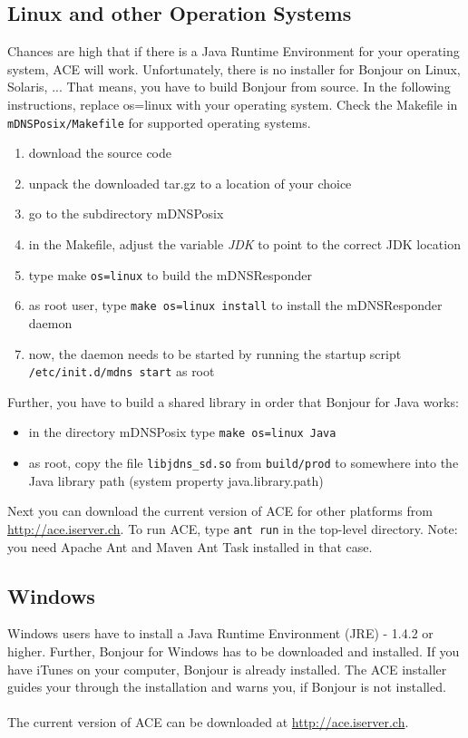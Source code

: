 \documentclass[11pt,a4paper]{article}
\begin{document}
\subsection{Linux and other Operation Systems}
Chances are high that if there is a Java Runtime Environment for your operating system, ACE will work. Unfortunately, there is no installer for Bonjour on Linux, Solaris, ... That means, you have to build Bonjour from source. In the following instructions, replace os=linux with your operating system. Check the Makefile in \texttt{mDNSPosix/Makefile} for supported operating systems.


\begin{enumerate}
\item download the source code
\item unpack the downloaded tar.gz to a location of your choice
\item go to the subdirectory mDNSPosix
\item in the Makefile, adjust the variable \textit{JDK} to point to the correct JDK location
\item type make \texttt{os=linux} to build the mDNSResponder
\item as root user, type \texttt{make os=linux install} to install the mDNSResponder daemon
\item now, the daemon needs to be started by running the startup script \texttt{/etc/init.d/mdns start} as root
\end{enumerate}

Further, you have to build a shared library in order that Bonjour for Java works:

\begin{itemize}
\item in the directory mDNSPosix type \texttt{make os=linux Java}
\item as root, copy the file \texttt{libjdns\_sd.so} from \texttt{build/prod} to somewhere into the Java library path (system property java.library.path)
\end{itemize}

Next you can download the current version of ACE for other platforms from \href{http://ace.iserver.ch}{http://ace.iserver.ch}. To run ACE, type \texttt{ant run} in the top-level directory. Note: you need Apache Ant and Maven Ant Task installed in that case.

\subsection{Windows}
Windows users have to install a Java Runtime Environment (JRE) - 1.4.2 or higher. Further, Bonjour for Windows has to be downloaded and installed. If you have iTunes on your computer, Bonjour is already installed. The ACE installer guides your through the installation and warns you, if Bonjour is not installed. \\
 \\
The current version of ACE can be downloaded at \href{http://ace.iserver.ch}{http://ace.iserver.ch}.
\end{document}
